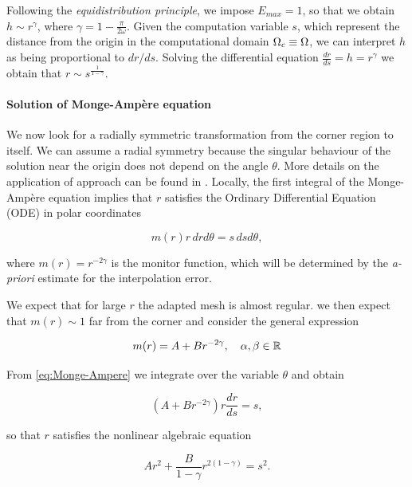 \documentclass[a4paper,11pt]{article}
\begin{document}
Following the \textit{equidistribution principle}, we impose $E_{max} = 1$, so that we obtain $h \sim r^{\gamma}$, where $\gamma = 1 - \frac{\pi}{2\omega}$. Given the computation variable $s$, which represent the distance from the origin in the computational domain $\Omega_{c} \equiv \Omega$, we can interpret $h$ as being proportional to $dr/ds$. Solving the differential equation $\frac{dr}{ds} = h = r^{\gamma}$ we obtain that $r \sim s^{\frac{1}{1-\gamma}}$.


\paragraph{Solution of Monge-Ampère equation}

We now look for a radially symmetric transformation from the corner region to itself. We can assume a radial symmetry because the singular behaviour of the solution near the origin does not depend on the angle $\theta$. More details on the application of approach can be found in \cite{BRW:2015}. Locally, the first integral of the Monge-Ampère equation implies that $r$ satisfies the Ordinary Differential Equation (ODE) in polar coordinates

\begin{equation}
    m(r)r \, dr d\theta = s \, ds d\theta,
\label{eq:Monge-Ampere}
\end{equation}

where $m(r) = r^{-2 \gamma}$ is the monitor function, which will be determined by the \textit{a-priori} estimate for the interpolation error.

We expect that for large $r$ the adapted mesh is almost regular. we then expect that $m(r) \sim 1$ far from the corner and consider the general expression 

\begin{equation}
    m(r) = A + B r^{-2 \gamma}, \quad \alpha,\beta \in \mathbb R
\end{equation}


From \eqref{eq:Monge-Ampere} we integrate over the variable $\theta$ and obtain

$$\left(A + B r^{-2\gamma}\right) r \frac{dr}{ds} = s,$$

so that $r$ satisfies the nonlinear algebraic equation 

\begin{equation}
    A r^{2} + \frac{B}{1-\gamma}r^{2(1-\gamma)} = s^{2}.
\label{eq:mesh_transformation}
\end{equation}
\end{document}
